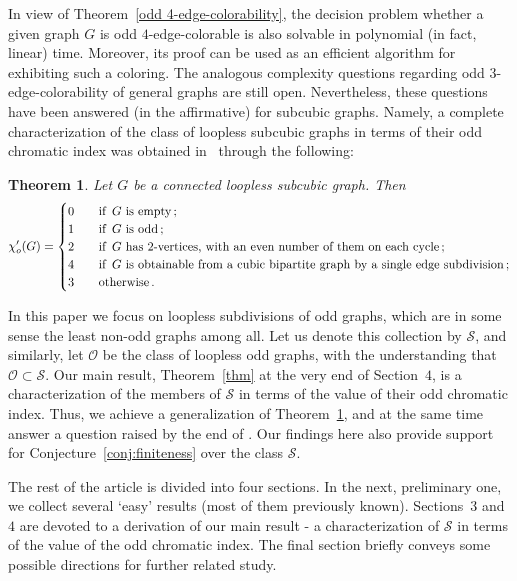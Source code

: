 \documentclass[a4paper,12pt]{article}
\newtheorem{theorem}{Theorem}[section]
\numberwithin{equation}{section}
\begin{document}
In view of Theorem~\ref{odd 4-edge-colorability}, the decision problem whether a given graph $G$ is odd $4$-edge-colorable is also solvable in polynomial (in fact, linear) time. Moreover, its proof can be used as an efficient algorithm for exhibiting such a coloring. The analogous complexity questions regarding odd $3$-edge-colorability of general graphs are still open. Nevertheless, these questions have been answered (in the affirmative) for subcubic graphs. Namely, a complete characterization of the class of loopless subcubic graphs in terms of their odd chromatic index was obtained in~\cite{AtaPetSkr16} through the following:

\begin{theorem}
    \label{thm:characterizationsubcubic}
Let $G$ be a connected loopless subcubic graph. Then
\begin{equation*}
\chi'_o(G)=
\begin{cases}
0 & \text{\quad if\, } G \text{ is empty}\,;\\
1 & \text{\quad if \,} G \text{ is odd} \,;\\
2 & \text{\quad if \,} G \text{ has 2-vertices, with an even number of them on each cycle}\,;\\
4 & \text{\quad if \,} G \text{ is obtainable from a cubic bipartite graph by a single edge subdivision}\,;\\
3 & \text{\quad otherwise}\,.
\end{cases}
\end{equation*}
\end{theorem}

In this paper we focus on loopless subdivisions of odd graphs, which are in some sense the least non-odd graphs among all. Let us denote this collection by $\mathcal{S}$, and similarly, let $\mathcal{O}$ be the class of loopless odd graphs, with the understanding that $\mathcal{O}\subset\mathcal{S}$. Our main result,  Theorem~\ref{thm} at the very end of Section~$4$, is a characterization of the members of $\mathcal{S}$ in terms of the value of their odd chromatic index. Thus, we achieve a generalization of Theorem~\ref{thm:characterizationsubcubic}, and at the same time answer a question raised by the end of \cite{Pet18}. Our findings here also provide support for  Conjecture~\ref{conj:finiteness} over the class $\mathcal{S}$.

\medskip

The rest of the article is divided into four sections. In the next, preliminary one, we collect several `easy' results (most of them previously known). Sections~$3$ and $4$ are devoted to a derivation of our main result - a characterization of $\mathcal{S}$ in terms of the value of the odd chromatic index. The final section briefly conveys some possible directions for further related study.
\end{document}
